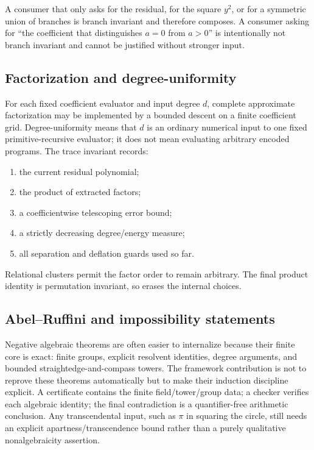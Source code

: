 A consumer that only asks for the residual, for the square $y^2$, or for a symmetric union of branches is branch invariant and therefore composes.  A consumer asking for ``the coefficient that distinguishes $a=0$ from $a>0$'' is intentionally not branch invariant and cannot be justified without stronger input.

\subsection{Factorization and degree-uniformity}

For each fixed coefficient evaluator and input degree $d$, complete approximate factorization may be implemented by a bounded descent on a finite coefficient grid.  Degree-uniformity means that $d$ is an ordinary numerical input to one fixed primitive-recursive evaluator; it does not mean evaluating arbitrary encoded programs.  The trace invariant records:
\begin{enumerate}[label=(\roman*)]
\item the current residual polynomial;
\item the product of extracted factors;
\item a coefficientwise telescoping error bound;
\item a strictly decreasing degree/energy measure;
\item all separation and deflation guards used so far.
\end{enumerate}
Relational clusters permit the factor order to remain arbitrary.  The final product identity is permutation invariant, so  erases the internal choices.

\subsection{Abel--Ruffini and impossibility statements}

Negative algebraic theorems are often easier to internalize because their finite core is exact: finite groups, explicit resolvent identities, degree arguments, and bounded straightedge-and-compass towers.  The framework contribution is not to reprove these theorems automatically but to make their induction discipline explicit.  A certificate contains the finite field/tower/group data; a checker verifies each algebraic identity; the final contradiction is a quantifier-free arithmetic conclusion.  Any transcendental input, such as $\pi$ in squaring the circle, still needs an explicit apartness/transcendence bound rather than a purely qualitative nonalgebraicity assertion.
